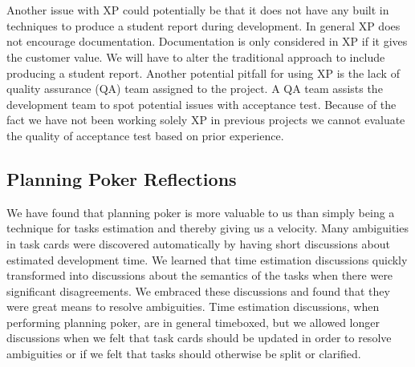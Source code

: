 \\\\
Another issue with XP could potentially be that it does not have any built in techniques to produce a student report during development. In general XP does not encourage documentation. Documentation is only considered in XP if it gives the customer value. We will have to alter the traditional approach to include producing a student report. Another potential pitfall for using XP is the lack of quality assurance (QA) team assigned to the project. A QA team assists the development team to spot potential issues with acceptance test. Because of the fact we have not been working solely XP in previous projects we cannot evaluate the quality of acceptance test based on prior experience.


\subsection{Planning Poker Reflections}

We have found that planning poker is more valuable to us than simply being a technique for tasks estimation and thereby giving us a velocity. Many ambiguities in task cards were discovered automatically by having short discussions about estimated development time. We learned that time estimation discussions quickly transformed into discussions about the semantics of the tasks when there were significant disagreements. We embraced these discussions and found that they were great means to resolve ambiguities. Time estimation discussions, when performing planning poker, are in general timeboxed, but we allowed longer discussions when we felt that task cards should be updated in order to resolve ambiguities or if we felt that tasks should otherwise be split or clarified.  
